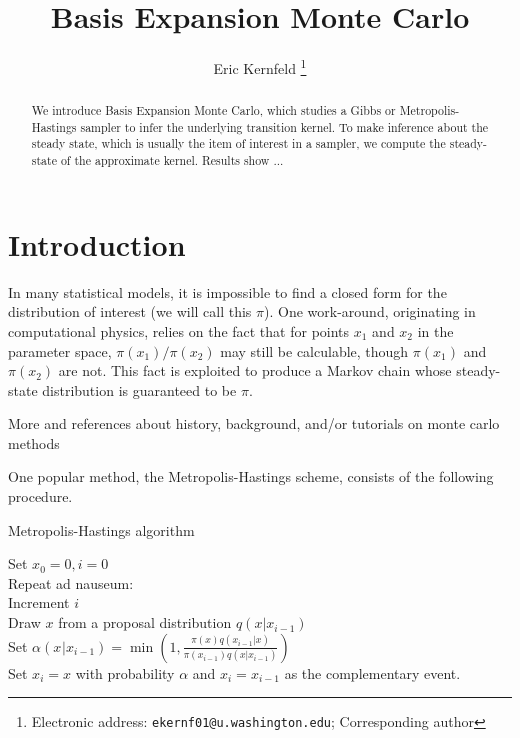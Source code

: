 \documentclass{article}
\begin{document}
\title{Basis Expansion Monte Carlo}

\author{Eric Kernfeld
  \thanks{Electronic address: \texttt{ekernf01@u.washington.edu}; Corresponding author}}
\maketitle

\begin{abstract}
We introduce Basis Expansion Monte Carlo, which studies a Gibbs or Metropolis-Hastings sampler to infer the underlying transition kernel. To make inference about the steady state, which is usually the item of interest in a sampler, we compute the steady-state of the approximate kernel. Results show ...
\end{abstract}


\section{Introduction}
In many statistical models, it is impossible to find a closed form for the distribution of interest (we will call this $\pi$). One work-around, originating in computational physics, relies on the fact that for points $x_1$ and $x_2$ in the parameter space, $\pi(x_1)/\pi(x_2)$ may still be calculable, though $\pi(x_1)$ and $\pi(x_2)$ are not. This fact is exploited to produce a Markov chain whose steady-state distribution is guaranteed to be $\pi$. 

More and references about history, background, and/or tutorials on monte carlo methods



One popular method, the Metropolis-Hastings scheme, consists of the following procedure.

\begin{algorithm}[h]
\caption{Metropolis-Hastings algorithm}
Set $x_0 = 0, i=0$\\
Repeat ad nauseum:\\
\Indp
Increment $i$\\
Draw $x$ from a proposal distribution $q(x|x_{i-1})$\\
Set $\alpha(x_{}|x_{i-1}) = \min(1, \frac{\pi(x)q(x_{i-1}|x)}{\pi(x_{i-1})q(x|x_{i-1})})$\\
Set $x_i = x$ with probability $\alpha$ and $x_i = x_{i-1}$ as the complementary event.\\
\end{algorithm}
\end{document}
